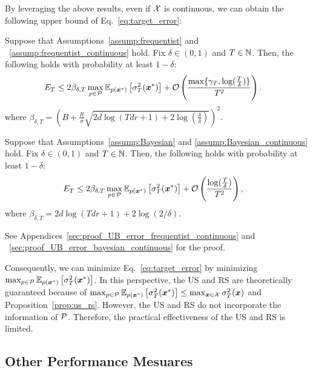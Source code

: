 By leveraging the above results, even if ${\cal X}$ is continuous, we can obtain the following upper bound of Eq.~\eqref{eq:target_error}:
\begin{lemma}
    Suppose that Assumptions~\ref{assump:frequentist} and ~\ref{assump:frequentist_continuous} hold.
    Fix $\delta \in (0, 1)$ and $T \in \mathbb{N}$.
    Then, the following holds with probability at least $1 - \delta$:
    \begin{align*}
        E_T 
        &\leq 2 \beta_{\delta, T} \max_{p \in {\cal P}} \mathbb{E}_{p(\boldsymbol{x}^*)} \left[  \sigma_T^2(\boldsymbol{x}^*) \right] 
        + {\cal O} \left( \frac{\max\{\gamma_T, \log(\frac{T}{\delta})\}}{T^2} \right).
    \end{align*}
    where $\beta_{\delta, T} = \left( B + \frac{R}{\sigma} \sqrt{ 2 d \log \left( T d r + 1 \right) + 2 \log \left( \frac{4}{\delta} \right)} \right)^2$.
    \label{lem:UB_error_frequentist_continuous}
\end{lemma}
\begin{lemma}
    Suppose that Assumptions~\ref{assump:Bayesian} and \ref{assump:Bayesian_continuous} hold.
    Fix $\delta \in (0, 1)$ and $T \in \mathbb{N}$.
    Then, the following holds with probability at least $1 - \delta$:
    \begin{align*}
        E_T 
        &\leq 2 \beta_{\delta, T} \max_{p \in {\cal P}} \mathbb{E}_{p(\boldsymbol{x}^*)} \left[  \sigma_T^2(\boldsymbol{x}^*) \right] 
        + {\cal O}\left( \frac{\log(\frac{T}{\delta})}{T^2} \right),
    \end{align*}
    where $\beta_{\delta, T} = 2d \log (T d r + 1) + 2 \log (2 / \delta)$.
    \label{lem:UB_error_bayesian_continuous}
\end{lemma}
See Appendices~\ref{sec:proof_UB_error_frequentist_continuous} and ~\ref{sec:proof_UB_error_bayesian_continuous} for the proof.


Consequently, we can  minimize Eq.~\eqref{eq:target_error} by minimizing $\max_{p \in {\cal P}} \mathbb{E}_{p(\boldsymbol{x}^{*})}\left[ \sigma^2_{T}(\boldsymbol{x}^{*}) \right]$.
%
In this perspective, the US and RS are theoretically guaranteed because of $\max_{p \in {\cal P}} \mathbb{E}_{p(\boldsymbol{x}^{*})}\left[ \sigma^2_{T}(\boldsymbol{x}^{*}) \right] \leq \max_{\boldsymbol{x} \in {\cal X}} \sigma^2_T (\boldsymbol{x})$ and Proposition~\ref{prop:us_rs}.
%
However, the US and RS do not incorporate the information of ${\cal P}$.
%
Therefore, the practical effectiveness of the US and RS is limited.
%


\subsection{Other Performance Mesuares}

